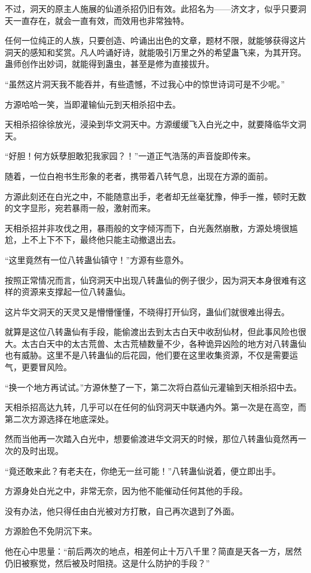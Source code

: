 \begin{this_body}
不过，洞天的原主人施展的仙道杀招仍旧有效。此招名为——济文才，似乎只要洞天一直存在，就会一直有效，而效用也非常独特。

任何一位纯正的人族，只要创造、吟诵出出色的文章，题材不限，就能够获得这片洞天的感知和奖赏。凡人吟诵好诗，就能吸引万里之外的希望蛊飞来，为其开窍。蛊师创作出妙词，就能得到蛊虫，甚至是修为直接拔升。

“虽然这片洞天我不能吞并，有些遗憾，不过我心中的惊世诗词可是不少呢。”

方源哈哈一笑，当即灌输仙元到天相杀招中去。

天相杀招徐徐放光，浸染到华文洞天中。方源缓缓飞入白光之中，就要降临华文洞天。

“好胆！何方妖孽胆敢犯我家园？！”一道正气浩荡的声音旋即传来。

随着，一位白袍书生形象的老者，携带着八转气息，出现在方源的面前。

方源此刻还在白光之中，不能随意出手，老者却无丝毫犹豫，伸手一推，顿时无数的文字显形，宛若暴雨一般，激射而来。

天相杀招并非攻伐之用，暴雨般的文字倾泻而下，白光轰然崩散，方源处境很尴尬，上不上下不下，最终他只能主动撤退出去。

“这里竟然有一位八转蛊仙镇守！”方源有些意外。

按照正常情况而言，仙窍洞天中出现八转蛊仙的例子很少，因为洞天本身很难有这样的资源来支撑起一位八转蛊仙。

这片华文洞天的天灵又是懵懵懂懂，不晓得打开仙窍，蛊仙们就很难出得去。

就算是这位八转蛊仙有手段，能偷渡出去到太古白天中收刮仙材，但此事风险也很大。太古白天中的太古荒兽、太古荒植数量不少，各种诡异凶险的地方对八转蛊仙也有威胁。这里不是八转蛊仙的后花园，他们要在这里收集资源，不仅是需要运气，更要冒风险。

“换一个地方再试试。”方源休整了一下，第二次将白荔仙元灌输到天相杀招中去。

天相杀招高达九转，几乎可以在任何的仙窍洞天中联通内外。第一次是在高空，而第二次方源选择在地底深处。

然而当他再一次踏入白光中，想要偷渡进华文洞天的时候，那位八转蛊仙竟然再一次的及时出现。

“竟还敢来此？有老夫在，你绝无一丝可能！”八转蛊仙说着，便立即出手。

方源身处白光之中，非常无奈，因为他不能催动任何其他的手段。

没有办法，他只得任由白光被对方打散，自己再次退到了外面。

方源脸色不免阴沉下来。

他在心中思量：“前后两次的地点，相差何止十万八千里？简直是天各一方，居然仍旧被察觉，然后被及时阻挠。这是什么防护的手段？”


\end{this_body}
